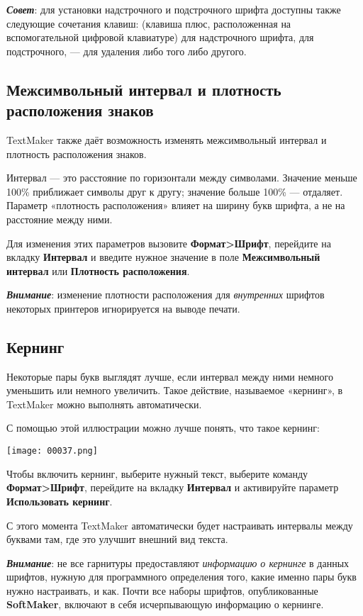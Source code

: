\documentclass[a4paper,10pt]{article}
\begin{document}
\textbf{\textit{Совет}}: для установки надстрочного и подстрочного шрифта доступны также следующие сочетания клавиш:  (клавиша плюс, расположенная на вспомогательной цифровой клавиатуре) для надстрочного шрифта,  для подстрочного,  --- для удаления либо того либо другого.

\subsection{Межсимвольный интервал и плотность расположения знаков}
TextMaker также даёт возможность изменять межсимвольный интервал и плотность расположения знаков.

Интервал — это расстояние по горизонтали между символами. Значение меньше 100\% приближает символы друг к другу; значение больше 100\% --- отдаляет.
Параметр «плотность расположения» влияет на ширину букв шрифта, а не на расстояние между ними.

Для изменения этих параметров вызовите \textbf{Формат>Шрифт}, перейдите на вкладку \textbf{Интервал} и введите нужное значение в поле \textbf{Межсимвольный интервал} или \textbf{Плотность расположения}.

\textit{\textbf{Внимание}}: изменение плотности расположения для \textit{внутренних} шрифтов некоторых принтеров игнорируется на выводе печати.

\subsection{Кернинг}
Некоторые пары букв выглядят лучше, если интервал между ними немного уменьшить или немного увеличить. Такое действие, называемое «кернинг», в TextMaker можно выполнять автоматически.

С помощью этой иллюстрации можно лучше понять, что такое кернинг:

\texttt{[image: 00037.png]}

Чтобы включить кернинг, выберите нужный текст, выберите команду \textbf{Формат>Шрифт}, перейдите на вкладку \textbf{Интервал} и активируйте параметр \textbf{Использовать кернинг}.

С этого момента TextMaker автоматически будет настраивать интервалы между буквами там, где это улучшит внешний вид текста.

\textit{\textbf{Внимание}}: не все гарнитуры предоставляют \textit{информацию о кернинге} в данных шрифтов, нужную для программного определения того, какие именно пары букв нужно настраивать, и как. Почти все наборы шрифтов, опубликованные \textbf{SoftMaker}, включают в себя исчерпывающую информацию о кернинге.
\end{document}
